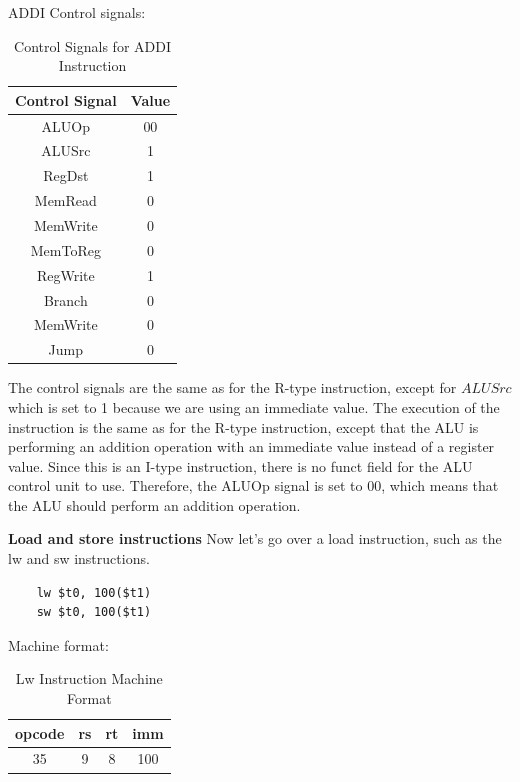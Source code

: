 ADDI Control signals:
\begin{table}[H]
    \centering
    \begin{tabular}{|c|c|}
    \hline
    \textbf{Control Signal} & \textbf{Value} \\ \hline
    ALUOp                   & 00             \\ \hline
    ALUSrc                  & 1             \\ \hline
    RegDst                  & 1             \\ \hline
    MemRead                 & 0             \\ \hline
    MemWrite                & 0             \\ \hline
    MemToReg                & 0             \\ \hline
    RegWrite                & 1             \\ \hline
    Branch                  & 0             \\ \hline
    MemWrite                 & 0             \\ \hline
    Jump                 & 0             \\ \hline
    \end{tabular}
    \caption{Control Signals for ADDI Instruction}
    \label{tab:addi_control_signals}
\end{table}

The control signals are the same as for the R-type instruction, except for $ALUSrc$ which is set to 1 because we are using an immediate value. The execution of the instruction is the same as for the R-type instruction, except that the ALU is performing an addition operation with an immediate value instead of a register value. Since this is an I-type instruction, there is no funct field for the ALU control unit to use. Therefore, the ALUOp signal is set to 00, which means that the ALU should perform an addition operation.

\textbf{Load and store instructions}\newline
Now let's go over a load instruction, such as the lw and sw instructions.
\begin{verbatim}
    lw $t0, 100($t1)
    sw $t0, 100($t1)
\end{verbatim}

Machine format:
\begin{table}[H]
    \centering
    \begin{tabular}{|c|c|c|c|}
    \hline
    \textbf{opcode} & \textbf{rs} & \textbf{rt} & \textbf{imm} \\ \hline
    35             & 9          & 8          & 100          \\ \hline
    \end{tabular}
    \caption{Lw Instruction Machine Format}
    \label{tab:lw_instruction}

\end{table}

